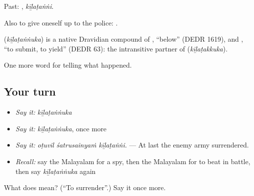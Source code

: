 Past: , \emph{kīḻaṭaṅṅi}.

Also to give oneself up to the police:   .

\begin{cousinweb}
\textbf{} (\emph{kīḻaṭaṅṅuka}) is a native Dravidian compound of , \textquotedblleft{}below\textquotedblright{} (DEDR 1619), and , \textquotedblleft{}to submit, to yield\textquotedblright{} (DEDR 63): the intransitive partner of  (\emph{kīḻaṭakkuka}).
\end{cousinweb}

\begin{grammarlens}[title={What you've built}]
One more word for telling what happened.
\end{grammarlens}

\subsection*{Your turn}
\begin{itemize}
\raggedright
  \item \emph{Say it:} \emph{kīḻaṭaṅṅuka}
  \item \emph{Say it:} \emph{kīḻaṭaṅṅuka}, once more
  \item \emph{Say it:} \emph{oṭuvil śatrusainyaṁ kīḻaṭaṅṅi.} — At last the enemy army surrendered.
  \item \emph{Recall:} say the Malayalam for a spy, then the Malayalam for to beat in battle, then say \emph{kīḻaṭaṅṅuka} again
\end{itemize}

\begin{tcolorbox}[breakable,colback=teal!4,colframe=teal!35!black,title={Before you move on}]
What does  mean? (\textquotedblleft{}To surrender\textquotedblright{}.) Say it once more.
\end{tcolorbox}
